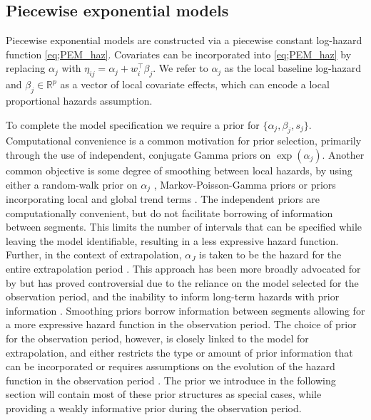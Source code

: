 \documentclass[ba,preprint]{imsart}
\theoremstyle{plain}
\theoremstyle{definition}
\theoremstyle{remark}
\begin{document}
\subsection{Piecewise exponential models}
\label{sec;PEM}
Piecewise exponential models \citep{Feigl1965, Ibrahim2001} are constructed via a piecewise constant log-hazard function \eqref{eq;PEM_haz}. Covariates can be incorporated into \eqref{eq;PEM_haz} by replacing $\alpha_j$ with $\eta_{ij} = \alpha_j + w_i^\top\beta_j$. We refer to $\alpha_j$ as the local baseline log-hazard and $\beta_j \in \mathbb{R}^p$ as a vector of local covariate effects, which can encode a local proportional hazards assumption.

To complete the model specification we require {\color{red}a prior} for $\{\alpha_j, \beta_j, s_j\}$. Computational convenience is a common motivation for prior selection, primarily through the use of independent, conjugate Gamma priors on $\exp(\alpha_j)$.  Another common objective is some degree of smoothing between local hazards, by using either a random-walk prior on $\alpha_j$ \citep{Fahrmeir2001}, Markov-Poisson-Gamma priors \citep{Lin2021} or priors incorporating local and global trend terms \citep{Kearns2019}.   The independent priors are computationally convenient, but do not facilitate borrowing of information between segments. This limits the number of intervals that can be specified while leaving the model identifiable, resulting in a less expressive hazard function. Further, in the context of extrapolation, $\alpha_J$ is taken to be the hazard for the entire extrapolation period \citep{Cooney2023a}. This approach has been more broadly advocated for by \cite{Bagust2014} but has proved controversial due to the reliance on the model selected for the observation period, and the inability to inform long-term hazards with prior information \citep{Latimer2014}.  Smoothing priors borrow information between segments allowing for a more expressive hazard function in the observation period. The choice of prior for the observation period, however, is closely linked to the model for extrapolation, and either restricts the type or amount of prior information that can be incorporated or requires assumptions on the evolution of the hazard function in the observation period \citep{Kearns2022}. The prior we introduce in the following section will contain most of these prior structures as special cases, while providing a weakly informative prior during the observation period.
\end{document}
